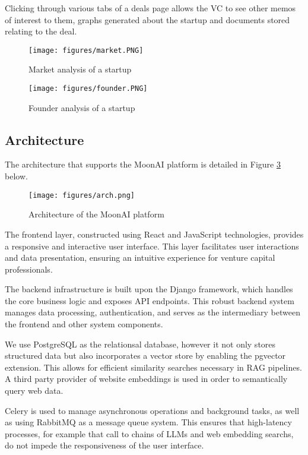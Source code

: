 \documentclass[a4paper, oneside]{discothesis}
\begin{document}
Clicking through various tabs of a deals page allows the VC to see other memos of interest to them, graphs generated about the startup and documents stored relating to the deal.

\begin{figure}[h]
    \centering
    \texttt{[image: figures/market.PNG]}
    \caption{Market analysis of a startup}
    \label{fig:market_memo}
\end{figure}

\begin{figure}[h]
    \centering
    \texttt{[image: figures/founder.PNG]}
    \caption{Founder analysis of a startup}
    \label{fig:founder_memo}
\end{figure}

\subsection{Architecture}

\noindent The architecture that supports the MoonAI platform is detailed in Figure \ref{fig:architecture} below.

\begin{figure}[h]
    \centering
    \texttt{[image: figures/arch.png]}
    \caption{Architecture of the MoonAI platform}
    \label{fig:architecture}
\end{figure}

The frontend layer, constructed using React and JavaScript technologies, provides a responsive and interactive user interface. This layer facilitates user interactions and data presentation, ensuring an intuitive experience for venture capital professionals.

The backend infrastructure is built upon the Django framework, which handles the core business logic and exposes API endpoints. This robust backend system manages data processing, authentication, and serves as the intermediary between the frontend and other system components.

We use PostgreSQL as the relationsal database, however it not only stores structured data but also incorporates a vector store by enabling the pgvector extension. This allows for efficient similarity searches necessary in RAG pipelines. A third party provider of website embeddings is used in order to semantically query web data.

Celery is used to manage asynchronous operations and background tasks, as well as using RabbitMQ as a message queue system. This ensures that high-latency processes, for example that call to chains of LLMs and web embedding searchs, do not impede the responsiveness of the user interface.
\end{document}
